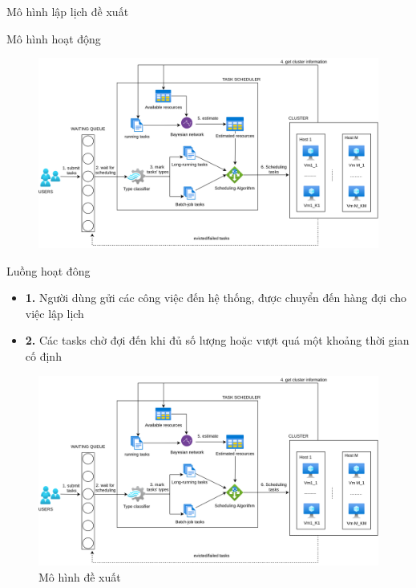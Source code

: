 \documentclass[11pt,xcolor={dvipsnames}, aspectratio=169]{beamer}
\begin{document}
\begin{frame}
{Mô hình lập lịch đề xuất}

\begin{block}
{\centering Mô hình hoạt động}
\begin{figure}
	\centering
	\includegraphics[scale=0.4]{images/system_flows.png}	
\end{figure}
\end{block}
\end{frame}

\begin{frame}
	\begin{minipage}[t]{0.4\linewidth}
		\begin{block}{Luồng hoạt đông}
		\begin{itemize}
			\item <1-> \textbf{1.} Người dùng gửi các công việc đến hệ thống, được chuyển đến hàng đợi cho việc lập lịch
			\item <2-> \textbf{2.} Các tasks chờ đợi đến khi đủ số lượng hoặc vượt quá một khoảng thời gian cố định 
		\end{itemize}
		\end{block}
	\end{minipage}
	\hfill
	\begin{minipage}[t]{0.59\linewidth}
		\begin{figure}
			\centering
			\includegraphics[scale=0.3]{images/system_flows.png}
			\caption{Mô hình đề xuất}
		\end{figure}
	\end{minipage}
\end{frame}
\end{document}
